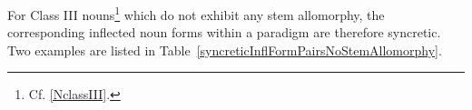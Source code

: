 For Class III nouns\footnote{Cf. \SEC\ref{NclassIII}.} 
which do not exhibit any stem allomorphy, %
the corresponding inflected noun forms within a paradigm are therefore syncretic. %
Two examples are listed in Table~\vref{syncreticInflFormPairsNoStemAllomorphy}.
\begin{table}[ht]\centering
\caption{Syncretic inflectional form sets for Class III nouns without stem allomorphy}\label{syncreticInflFormPairsNoStemAllomorphy}
\end{table}

